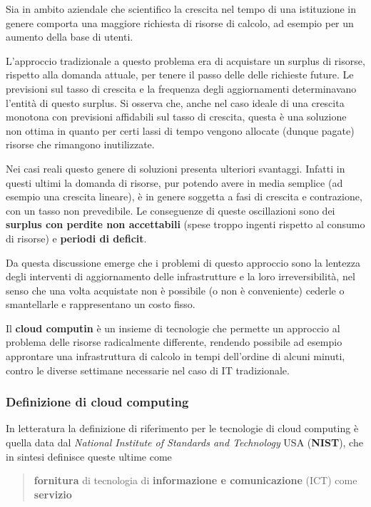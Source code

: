 Sia in ambito aziendale che scientifico la crescita nel tempo di una
istituzione in genere comporta una maggiore richiesta di risorse di
calcolo, ad esempio per un aumento della base di utenti.

L'approccio tradizionale a questo problema era di acquistare un surplus
di risorse, rispetto alla domanda attuale, per tenere il passo delle
delle richieste future. Le previsioni sul tasso di crescita e la
frequenza degli aggiornamenti determinavano l'entità di questo surplus.
Si osserva che, anche nel caso ideale di una crescita monotona con
previsioni affidabili sul tasso di crescita, questa è una soluzione non
ottima in quanto per certi lassi di tempo vengono allocate (dunque
pagate) risorse che rimangono inutilizzate.

Nei casi reali questo genere di soluzioni presenta ulteriori svantaggi.
Infatti in questi ultimi la domanda di risorse, pur potendo avere in
media semplice (ad esempio una crescita lineare), è in genere soggetta a
fasi di crescita e contrazione, con un tasso non prevedibile. Le
conseguenze di queste oscillazioni sono dei \textbf{surplus con perdite
non accettabili} (spese troppo ingenti rispetto al consumo di risorse) e
\textbf{periodi di deficit}.

Da questa discussione emerge che i problemi di questo approccio sono la
lentezza degli interventi di aggiornamento delle infrastrutture e la
loro irreversibilità, nel senso che una volta acquistate non è possibile
(o non è conveniente) cederle o smantellarle e rappresentano un costo
fisso.

Il \textbf{cloud computin} è un insieme di tecnologie che permette un
approccio al problema delle risorse radicalmente differente, rendendo
possibile ad esempio approntare una infrastruttura di calcolo in tempi
dell'ordine di alcuni minuti, contro le diverse settimane necessarie nel
caso di IT tradizionale.

\subsubsection{Definizione di cloud
computing}\label{definizione-di-cloud-computing}

In letteratura la definizione di riferimento per le tecnologie di cloud
computing è quella data dal \emph{National Institute of Standards and
Technology} USA (\textbf{NIST}), che in sintesi definisce queste ultime
come

\begin{quote}
\textbf{fornitura} di tecnologia di \textbf{informazione e
comunicazione} (ICT) come \textbf{servizio}
\end{quote}

